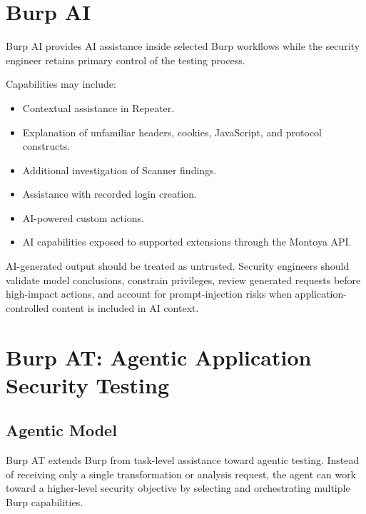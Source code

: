 \documentclass[11pt]{article}
\begin{document}
\section{Burp AI}

Burp AI provides AI assistance inside selected Burp workflows while the security engineer retains primary control of the testing process.

Capabilities may include:

\begin{itemize}
  \item Contextual assistance in Repeater.
  \item Explanation of unfamiliar headers, cookies, JavaScript, and protocol constructs.
  \item Additional investigation of Scanner findings.
  \item Assistance with recorded login creation.
  \item AI-powered custom actions.
  \item AI capabilities exposed to supported extensions through the Montoya API.
\end{itemize}

\begin{warningbox}
AI-generated output should be treated as untrusted. Security engineers should validate model conclusions, constrain privileges, review generated requests before high-impact actions, and account for prompt-injection risks when application-controlled content is included in AI context.
\end{warningbox}

\section{Burp AT: Agentic Application Security Testing}

\subsection{Agentic Model}

Burp AT extends Burp from task-level assistance toward agentic testing. Instead of receiving only a single transformation or analysis request, the agent can work toward a higher-level security objective by selecting and orchestrating multiple Burp capabilities.
\end{document}
